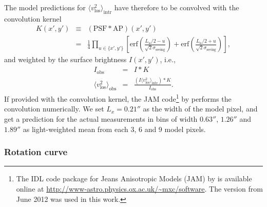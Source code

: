 \documentclass[useAMS,usenatbib]{mnras}
\begin{document}
The model predictions for $\langle v_\text{los}^2 \rangle_\text{intr}$ have therefore to be convolved with the convolution kernel
\begin{eqnarray*}
K(x',y') &\equiv& (\text{PSF} \ast \text{AP})(x',y') \\
&=& \frac{1}{4} \prod_{u \in \{x',y'\}} \left[ \text{erf}\left( \frac{L_u/2 - u}{\sqrt{2}\sigma_\text{seeing}}\right) + \text{erf} \left( \frac{L_u/2 + u}{\sqrt{2} \sigma_\text{seeing}} \right) \right],
\end{eqnarray*}
and weighted by the surface brightness $I(x',y')$, i.e.,
\begin{eqnarray*}
I_\text{obs} &=& I \ast K\\
\langle v_\text{los}^2 \rangle_\text{obs} &=& \frac{(I \langle v_\text{los}^2\rangle_\text{intr}) \ast K}{I_\text{obs}}.
\end{eqnarray*}
If provided with the convolution kernel, the JAM code\footnote{The IDL code package for Jeans Anisotropic Models (JAM) by \citet{Cap08} is available online at \url{http://www-astro.physics.ox.ac.uk/~mxc/software}. The version from June 2012 was used in this work.} by \citet{Cap08} performs the convolution numerically. We set $L_x = 0.21''$ as the width of the model pixel, and get a prediction for the actual measurements in bins of width $0.63''$, $1.26''$ and $1.89''$ \citep{SWELLSV} as light-weighted mean from each 3, 6 and 9 model pixels.

\subsubsection{Rotation curve} \label{sec:model_JAM_rotation}
\end{document}
